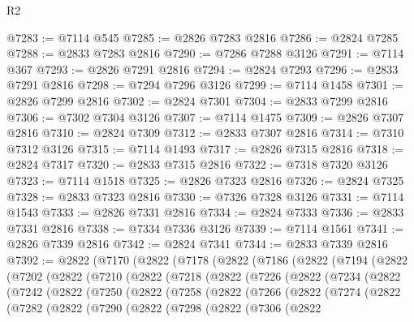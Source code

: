 \begin{lexlean}{R2}
\begin{coremodule}
@7283 := @7114 @545
@7285 := @2826 @7283 @2816
@7286 := @2824 @7285
@7288 := @2833 @7283 @2816
@7290 := @7286 @7288 @3126
@7291 := @7114 @367
@7293 := @2826 @7291 @2816
@7294 := @2824 @7293
@7296 := @2833 @7291 @2816
@7298 := @7294 @7296 @3126
@7299 := @7114 @1458
@7301 := @2826 @7299 @2816
@7302 := @2824 @7301
@7304 := @2833 @7299 @2816
@7306 := @7302 @7304 @3126
@7307 := @7114 @1475
@7309 := @2826 @7307 @2816
@7310 := @2824 @7309
@7312 := @2833 @7307 @2816
@7314 := @7310 @7312 @3126
@7315 := @7114 @1493
@7317 := @2826 @7315 @2816
@7318 := @2824 @7317
@7320 := @2833 @7315 @2816
@7322 := @7318 @7320 @3126
@7323 := @7114 @1518
@7325 := @2826 @7323 @2816
@7326 := @2824 @7325
@7328 := @2833 @7323 @2816
@7330 := @7326 @7328 @3126
@7331 := @7114 @1543
@7333 := @2826 @7331 @2816
@7334 := @2824 @7333
@7336 := @2833 @7331 @2816
@7338 := @7334 @7336 @3126
@7339 := @7114 @1561
@7341 := @2826 @7339 @2816
@7342 := @2824 @7341
@7344 := @2833 @7339 @2816
@7392 := @2822
    (@7170
      (@2822
        (@7178
          (@2822
            (@7186
              (@2822
                (@7194
                  (@2822
                    (@7202
                      (@2822
                        (@7210
                          (@2822
                            (@7218
                              (@2822
                                (@7226
                                  (@2822
                                    (@7234
                                      (@2822
                                        (@7242
                                          (@2822
                                            (@7250
                                              (@2822
                                                (@7258
                                                  (@2822
                                                    (@7266
                                                      (@2822
                                                        (@7274
                                                          (@2822
                                                            (@7282
                                                              (@2822
                                                                (@7290
                                                                  (@2822
                                                                    (@7298
                                                                      (@2822
                                                                        (@7306
                                                                          (@2822

\end{coremodule}
\end{lexlean}
